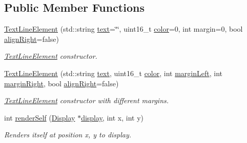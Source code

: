 \subsection*{Public Member Functions}
\begin{DoxyCompactItemize}
\item 
\mbox{\hyperlink{classScreen_1_1TextLineElement_ae0de60080a1c3f6c1be23448927e0717}{Text\+Line\+Element}} (std\+::string \mbox{\hyperlink{classScreen_1_1TextLineElement_ad2495931e2dd28b0d7cb5d8c761dedad}{text}}=\char`\"{}\char`\"{}, uint16\+\_\+t \mbox{\hyperlink{classScreen_1_1TextLineElement_ac4fa4d52ead8e4b38ba18c673875fae2}{color}}=0, int margin=0, bool \mbox{\hyperlink{classScreen_1_1LineElement_a0c5f4e33c2df1dce8e4e45b90dac1423}{align\+Right}}=false)
\begin{DoxyCompactList}\small\item\em \mbox{\hyperlink{classScreen_1_1TextLineElement}{Text\+Line\+Element}} constructor. \end{DoxyCompactList}\item 
\mbox{\hyperlink{classScreen_1_1TextLineElement_ae6f666d60594d487b9c43310c470ec59}{Text\+Line\+Element}} (std\+::string \mbox{\hyperlink{classScreen_1_1TextLineElement_ad2495931e2dd28b0d7cb5d8c761dedad}{text}}, uint16\+\_\+t \mbox{\hyperlink{classScreen_1_1TextLineElement_ac4fa4d52ead8e4b38ba18c673875fae2}{color}}, int \mbox{\hyperlink{classScreen_1_1LineElement_a9ed23f9510a11334af9be6f53965f7a6}{margin\+Left}}, int \mbox{\hyperlink{classScreen_1_1LineElement_a3a2077f01072be8e8fd0f4539b85beb0}{margin\+Right}}, bool \mbox{\hyperlink{classScreen_1_1LineElement_a0c5f4e33c2df1dce8e4e45b90dac1423}{align\+Right}}=false)
\begin{DoxyCompactList}\small\item\em \mbox{\hyperlink{classScreen_1_1TextLineElement}{Text\+Line\+Element}} constructor with different margins. \end{DoxyCompactList}\item 
int \mbox{\hyperlink{classScreen_1_1TextLineElement_abcd2e0700f84bb19d7a285345cd37871}{render\+Self}} (\mbox{\hyperlink{classDisplay}{Display}} $\ast$\mbox{\hyperlink{classScreen_aad713267725e8aa8a8def951a07de641}{display}}, int x, int y)
\begin{DoxyCompactList}\small\item\em Renders itself at position x, y to display. \end{DoxyCompactList}\end{DoxyCompactItemize}
